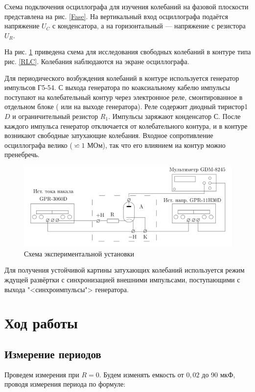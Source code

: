 \documentclass[12pt]{kiarticle} %
\begin{document}
Схема подключения осциллографа для изучения колебаний на фазовой плоскости представлена на рис. \ref{Fase}. На вертикальный вход осциллографа подаётся напряжение $ U_C $ с конденсатора, а на горизонтальный --- напряжение с резистора $ U_R $.

На рис. \ref{lab} приведена схема для исследования свободных колебаний в контуре типа рис. \ref{RLC}. Колебания наблюдаются на экране осциллографа.

Для периодического возбуждения колебаний в контуре используется
генератор импульсов Г5-54. С выхода генератора по коаксиальному кабелю импульсы поступают на колебательный контур через электронное
реле, смонтированное в отдельном блоке ( или на выходе генератора).
Реле содержит диодный тиристор1 $ D $ и ограничительный резистор $ R_1 $.
Импульсы заряжают конденсатор $ С $. После каждого импульса генератор
отключается от колебательного контура, и в контуре возникают
свободные затухающие колебания. Входное сопротивление осциллографа
велико ($ \backsimeq 1$ МОм), так что его влиянием иа контур можно пренебречь.

\begin{figure}[h]
	\includegraphics[width=15cm]{lab}
	\caption{Схема экспериментальной установки}
	\label{lab}
\end{figure}

Для получения устойчивой картины затухающих колебаний используется
режим ждущей развёртки с синхронизацией внешними импульсами,
поступающими с выхода "<синхроимпульсы"> генератора.

\section{Ход работы}

\subsection{Измерение периодов}

Проведем измерения при $ R = 0 $. Будем изменять емкость от $ 0,02 $ до 90 мкФ, проводя измерения периода по формуле:
\end{document}
